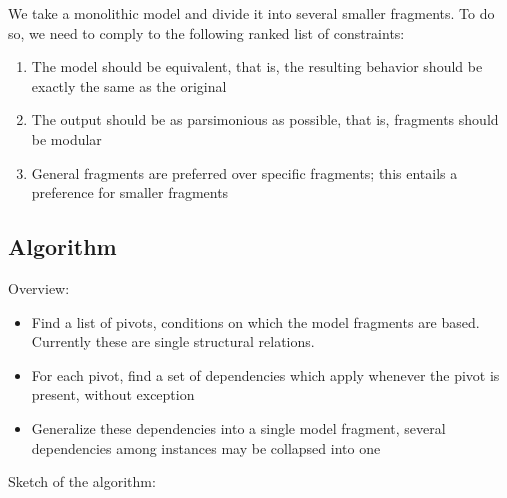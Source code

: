 \documentclass{article}
\begin{document}
We take a monolithic model and divide it into several smaller fragments. To do
so, we need to comply to the following ranked list of constraints:

\begin{enumerate}
\item The model should be equivalent, that is, the resulting behavior should be
	exactly the same as the original

\item The output should be as parsimonious as possible, that is, fragments
	should be modular

\item General fragments are preferred over specific fragments; this entails a
	preference for smaller fragments

\end{enumerate}

\subsection{Algorithm}

Overview:

\begin{itemize}

\item Find a list of pivots, conditions on which the model fragments are based.
	Currently these are single structural relations.

\item For each pivot, find a set of dependencies which apply whenever the pivot
	is present, without exception

\item Generalize these dependencies into a single model fragment, several
	dependencies among instances may be collapsed into one

\end{itemize}

%
%

Sketch of the algorithm:
\end{document}
